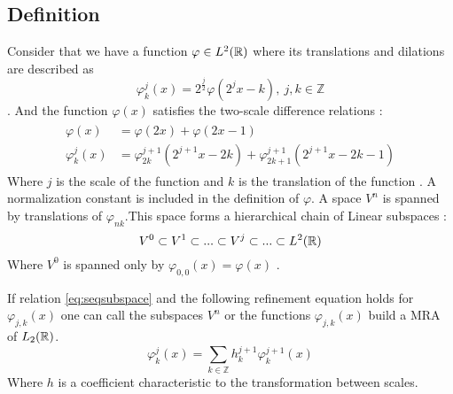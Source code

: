 \documentclass[../master_thesis.tex]{subfiles}
\begin{document}
\subsection{Definition}
Consider that we have a function $\varphi \in L^2(\mathbb{R})$ where its translations
and dilations are described as \cite{Schneider:2007}
\begin{equation}
  \varphi^j_k(x) = 2^{\frac{j}{2}}\varphi(2^jx - k),\  j,k \in \mathbb{Z}
\end{equation}.
And the function $\varphi(x)$ satisfies the two-scale difference relations \cite{Beylkin:MRA, Schneider:2007, Sorland}:
\begin{align}
  \begin{split}
    \varphi(x) &= \varphi(2x) + \varphi(2x - 1)\\
    \varphi^j_k(x) &= \varphi^{j+1}_{2k}(2^{j+1}x - 2k) + \varphi^{j+1}_{2k+1}(2^{j+1}x - 2k - 1)
  \end{split}
\end{align}
Where $j$ is the scale of the function and $k$ is the translation of the function
\cite{Sorland}. A normalization constant is included in the definition of $\varphi$.
A space $V^n$ is spanned by translations of $\varphi_{nk}$.This space forms a
hierarchical chain of Linear
subspaces \cite{Beylkin:MRA}:
\begin{equation}
  V^0 \subset V^1 \subset ... \subset V^j \subset ... \subset L^2(\mathbb{R})\label{eq:seqsubspace}
\end{equation}
Where $V^0$ is spanned only by $\varphi_{0,0}(x)=\varphi(x)$ \cite{Sorland}.

If relation \ref{eq:seqsubspace} and the following refinement equation holds for $\varphi_{j,k}(x)$
one can call the subspaces $V^n$ or the functions $\varphi_{j,k}(x)$ build a \ac{MRA} of $L_2(\mathbb{R})$.
\begin{equation}
\varphi^j_k(x) = \sum_{k\in\mathbb{Z}} h^{j+1}_k\varphi^{j+1}_k(x)
\end{equation}
Where $h$ is a coefficient characteristic to the transformation between scales.
\end{document}
